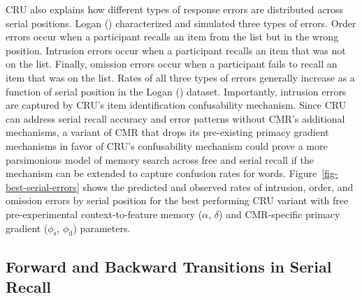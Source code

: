 \documentclass[
  man,
  floatsintext,
  longtable,
  nolmodern,
  notxfonts,
  notimes,
  draftfirst,
  colorlinks=true,linkcolor=blue,citecolor=blue,urlcolor=blue]{apa7}
\begin{document}
CRU also explains how different types of response errors are distributed
across serial positions. Logan ()
characterized and simulated three types of errors. Order errors occur
when a participant recalls an item from the list but in the wrong
position. Intrusion errors occur when a participant recalls an item that
was not on the list. Finally, omission errors occur when a participant
fails to recall an item that was on the list. Rates of all three types
of errors generally increase as a function of serial position in the
Logan () dataset. Importantly,
intrusion errors are captured by CRU's item identification confusability
mechanism. Since CRU can address serial recall accuracy and error
patterns without CMR's additional mechanisms, a variant of CMR that
drops its pre-existing primacy gradient mechanisms in favor of CRU's
confusability mechanism could prove a more parsimonious model of memory
search across free and serial recall if the mechanism can be extended to
capture confusion rates for words. Figure~\ref{fig-best-serial-errors}
shows the predicted and observed rates of intrusion, order, and omission
errors by serial position for the best performing CRU variant with free
pre-experimental context-to-feature memory (\(\alpha\), \(\delta\)) and
CMR-specific primacy gradient (\(\phi_\text{s}\), \(\phi_\text{d}\))
parameters.

\subsection{Forward and Backward Transitions in Serial
Recall}\label{forward-and-backward-transitions-in-serial-recall}
\end{document}
